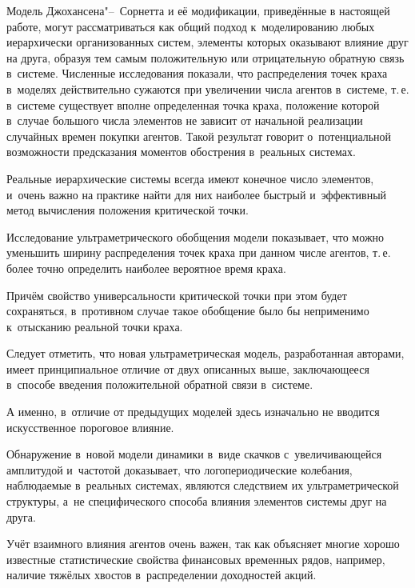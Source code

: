 \smallskip


Модель Джохансена"--~Сорнетта и её модификации, приведённые в настоящей работе, могут рассматриваться как общий подход к~моделированию любых иерархически организованных систем, элементы которых оказывают влияние друг на друга, образуя тем самым положительную или отрицательную обратную связь в~системе. Численные исследования показали, что распределения точек краха в~моделях действительно сужаются при увеличении числа агентов в~системе, т.\,е. в~системе существует вполне определенная точка краха, положение которой в~случае большого числа элементов не зависит от начальной реализации случайных времен покупки агентов. Такой результат говорит о~потенциальной возможности предсказания моментов обострения в~реальных системах.



Реальные иерархические системы всегда имеют конечное число элементов, и~очень важно на практике найти для них наиболее быстрый и~эффективный метод вычисления положения критической точки.

Исследование ультраметрического обобщения модели показывает, что можно уменьшить ширину распределения точек краха при данном числе агентов, т.\,е. более точно определить наиболее вероятное время краха.

Причём свойство универсальности критической точки при этом будет сохраняться, в~противном случае такое обобщение было бы неприменимо к~отысканию реальной точки краха.



Следует отметить, что новая ультраметрическая модель, разработанная авторами, имеет принципиальное отличие от двух описанных выше, заключающееся в~способе введения положительной обратной связи в~системе.

А именно, в~отличие от предыдущих моделей здесь изначально не вводится искусственное пороговое влияние.

Обнаружение в~новой модели динамики в~виде скачков с~увеличивающейся амплитудой и~частотой доказывает, что логопериодические колебания, наблюдаемые в~реальных системах, являются следствием их ультраметрической структуры, а~не специфического способа влияния элементов системы друг на друга.



Учёт взаимного влияния агентов очень важен, так как объясняет многие хорошо известные статистические свойства финансовых временных рядов, например, наличие тяжёлых хвостов в~распределении доходностей акций.

